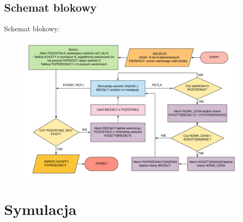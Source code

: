 \documentclass{beamer}
\begin{document}
\subsection{Schemat blokowy}
\begin{frame}
	Schemat blokowy:
	\pause
	\begin{figure}
		\centering
		\includegraphics[width=1\linewidth]{flowchart1.png}
	\end{figure}
\end{frame}

\section{Symulacja}
\end{document}
